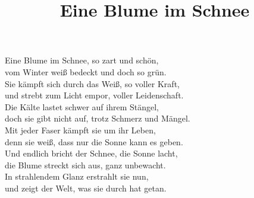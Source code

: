 \documentclass[12pt]{article}
\title{Eine Blume im Schnee}
\begin{document}
 
\maketitle

\Large
\setlength{\leftskip}{36pt}
\setlength{\parindent}{0pt}
\setlength{\parskip}{12pt}


Eine Blume im Schnee, so zart und schön,\\
vom Winter weiß bedeckt und doch so grün.\\
Sie kämpft sich durch das Weiß, so voller Kraft,\\
und strebt zum Licht empor, voller Leidenschaft.\\

Die Kälte lastet schwer auf ihrem Stängel,\\
doch sie gibt nicht auf, trotz Schmerz und Mängel.\\
Mit jeder Faser kämpft sie um ihr Leben,\\
denn sie weiß, dass nur die Sonne kann es geben.\\

Und endlich bricht der Schnee, die Sonne lacht,\\
die Blume streckt sich aus, ganz unbewacht.\\
In strahlendem Glanz erstrahlt sie nun,\\
und zeigt der Welt, was sie durch hat getan.\\
\end{document}
